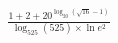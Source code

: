 \documentclass[preview]{standalone}
\begin{document}
\begin{align*}
\frac{1+2+20^{\log_{20}(\sqrt{ 16 }-1)}}{\log_{525}(525)\times \ln e^{2}}
\end{align*}
\end{document}
